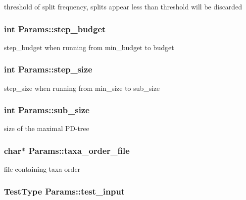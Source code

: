 \label{structParams_a8e5d88154702dd77ae3acc1244b6b0ac}
threshold of split frequency, splits appear less than threshold will be discarded \hypertarget{structParams_aa1f16d303940a9d714226c8b8daab901}{
\subsubsection[{step\_\-budget}]{\setlength{\rightskip}{0pt plus 5cm}int {\bf Params::step\_\-budget}}}
\label{structParams_aa1f16d303940a9d714226c8b8daab901}
step\_\-budget when running from min\_\-budget to budget \hypertarget{structParams_ac667acebdd5c50499542b4da18d6f60c}{
\subsubsection[{step\_\-size}]{\setlength{\rightskip}{0pt plus 5cm}int {\bf Params::step\_\-size}}}
\label{structParams_ac667acebdd5c50499542b4da18d6f60c}
step\_\-size when running from min\_\-size to sub\_\-size \hypertarget{structParams_a9eb4314daa4b7cf2d08d974c25665d90}{
\subsubsection[{sub\_\-size}]{\setlength{\rightskip}{0pt plus 5cm}int {\bf Params::sub\_\-size}}}
\label{structParams_a9eb4314daa4b7cf2d08d974c25665d90}
size of the maximal PD-\/tree \hypertarget{structParams_ad15ab64e7e9b8686c789aee676c19ac9}{
\subsubsection[{taxa\_\-order\_\-file}]{\setlength{\rightskip}{0pt plus 5cm}char$\ast$ {\bf Params::taxa\_\-order\_\-file}}}
\label{structParams_ad15ab64e7e9b8686c789aee676c19ac9}
file containing taxa order \hypertarget{structParams_aa079ee14272d9032681bb814d21fb6db}{
\subsubsection[{test\_\-input}]{\setlength{\rightskip}{0pt plus 5cm}TestType {\bf Params::test\_\-input}}}

